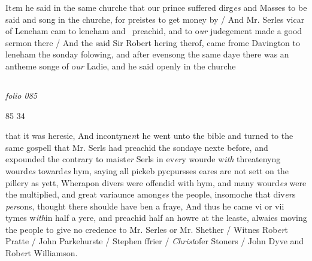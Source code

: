 \documentclass[12pt, a4paper]{book}
\begin{document}
 
 	
				\marginpar[\vspace{0.5cm}{\textcolor{Gray}{seditious}}]{}
			
            	
		\ifthenelse{\isodd{\thepage}}
		{\reversemarginpar}
		{\normalmarginpar}
		It\textit{e}m he said in the same churche that our prince suffered dirg\textit{es} and
 Masses to be said and song in the churche, for preistes to get money
 by / And Mr. Serles vicar of Leneham cam to leneham and 
 preachid, and to o\textit{ur} judegement made a good sermon there / And the
            		said Sir Robert hering therof, came frome Davington to leneham
 the sonday folowing, and after evensong the same daye there
 was an antheme songe of o\textit{ur} Ladie, and he said openly in the churche


\dotfill
					  \subsection*{}  \subsection*{}

\textit{folio 085}


\begin{flushright}{\color{Mahogany}85} 34\end{flushright}

		\ifthenelse{\isodd{\thepage}}
		{\reversemarginpar}
		{\normalmarginpar}
		that it was heresie, And incontyne\textit{n}t he went unto the bible
 and turned to the same gospell that Mr. Serls had preachid
 the sondaye nexte before, and expounded the contrary to maist\textit{er}
 Serls in ev\textit{er}y wourde w\textit{ith} threatenyng wourd\textit{es} toward\textit{es} hym, saying
 all pickeb pycpursses eares are not sett on the pillery as yett,
 Wherapon divers were offendid with hym, and many wourd\textit{es} were
 the multiplied, and great variaunce among\textit{es} the people, insomoche
 that div\textit{er}s \textit{per}sons, thought there shoulde have ben a fraye, And
 thus he came vi or vii tymes w\textit{ith}in half a yere, and preachid
 half an howre at the leaste, alwaies moving the people to
 give no credence to Mr. Serles or Mr. Shether / Witnes
	Rob\textit{er}t Pratte / John Parkehurste / Stephen ffrier / \textit{Christ}ofer
		Stoners / John Dyve and Rob\textit{er}t Williamson.
\end{document}

